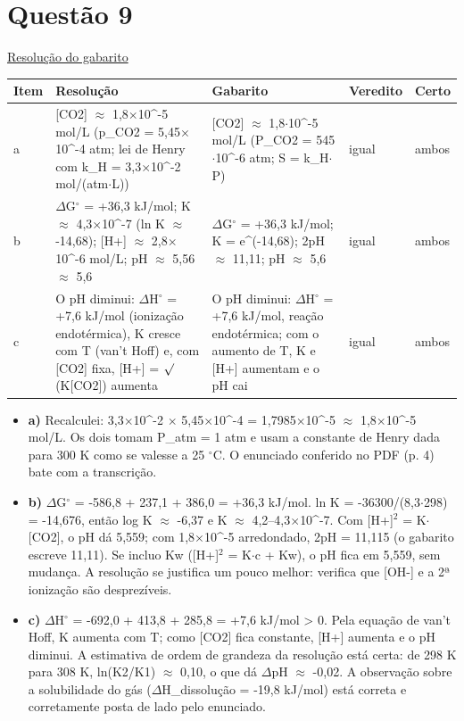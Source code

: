 \documentclass{article}%
\begin{document}
\section*{Questão 9}%
\href{https://poliedroresolve.sistemapoliedro.com.br/vestibulares/ime/2026/ime-2-fase-dia-3-25-10-2025-2-fase-dia-3/dissertativa-9-quimica-2-fase-dia-3-ime-2026}{Resolução do gabarito}\par\smallskip%
\begin{longtable}{@{}p{} p{} p{} p{} p{}@{}}\toprule Item & Resolução & Gabarito & Veredito & Certo \\ \midrule
a & {[}CO2{]} $\approx$ 1,8$\times$10\^{}{-}5 mol/L (p\_CO2 = 5,45$\times$10\^{}{-}4 atm; lei de Henry com k\_H = 3,3$\times$10\^{}{-}2 mol/(atm$\cdot$L)) & {[}CO2{]} $\approx$ 1,8$\cdot$10\^{}{-}5 mol/L (P\_CO2 = 545$\cdot$10\^{}{-}6 atm; S = k\_H$\cdot$P) & igual & ambos \\
b & $\Delta$G$^\circ$ = +36,3 kJ/mol; K $\approx$ 4,3$\times$10\^{}{-}7 (ln K $\approx$ -14,68); {[}H+{]} $\approx$ 2,8$\times$10\^{}{-}6 mol/L; pH $\approx$ 5,56 $\approx$ 5,6 & $\Delta$G$^\circ$ = +36,3 kJ/mol; K = e\^{}(-14,68); 2pH $\approx$ 11,11; pH $\approx$ 5,6 & igual & ambos \\
c & O pH diminui: $\Delta$H$^\circ$ = +7,6 kJ/mol (ionização endotérmica), K cresce com T (van't Hoff) e, com {[}CO2{]} fixa, {[}H+{]} = $\surd$(K{[}CO2{]}) aumenta & O pH diminui: $\Delta$H$^\circ$ = +7,6 kJ/mol, reação endotérmica; com o aumento de T, K e {[}H+{]} aumentam e o pH cai & igual & ambos \\
\bottomrule\end{longtable}%
\begin{itemize}%
\item%
\textbf{a)} Recalculei: 3,3$\times$10\^{}{-}2 $\times$ 5,45$\times$10\^{}{-}4 = 1,7985$\times$10\^{}{-}5 $\approx$ 1,8$\times$10\^{}{-}5 mol/L. Os dois tomam P\_atm = 1 atm e usam a constante de Henry dada para 300 K como se valesse a 25 $^\circ$C. O enunciado conferido no PDF (p. 4) bate com a transcrição.%
\item%
\textbf{b)} $\Delta$G$^\circ$ = -586,8 + 237,1 + 386,0 = +36,3 kJ/mol. ln K = -36300/(8,3$\cdot$298) = -14,676, então log K $\approx$ -6,37 e K $\approx$ 4,2--4,3$\times$10\^{}{-}7. Com {[}H+{]}$^2$ = K$\cdot${[}CO2{]}, o pH dá 5,559; com 1,8$\times$10\^{}{-}5 arredondado, 2pH = 11,115 (o gabarito escreve 11,11). Se incluo Kw ({[}H+{]}$^2$ = K$\cdot$c + Kw), o pH fica em 5,559, sem mudança. A resolução se justifica um pouco melhor: verifica que {[}OH-{]} e a 2ª ionização são desprezíveis.%
\item%
\textbf{c)} $\Delta$H$^\circ$ = -692,0 + 413,8 + 285,8 = +7,6 kJ/mol > 0. Pela equação de van't Hoff, K aumenta com T; como {[}CO2{]} fica constante, {[}H+{]} aumenta e o pH diminui. A estimativa de ordem de grandeza da resolução está certa: de 298 K para 308 K, ln(K2/K1) $\approx$ 0,10, o que dá $\Delta$pH $\approx$ -0,02. A observação sobre a solubilidade do gás ($\Delta$H\_dissolução = -19,8 kJ/mol) está correta e corretamente posta de lado pelo enunciado.%
\end{itemize}%
\end{document}
